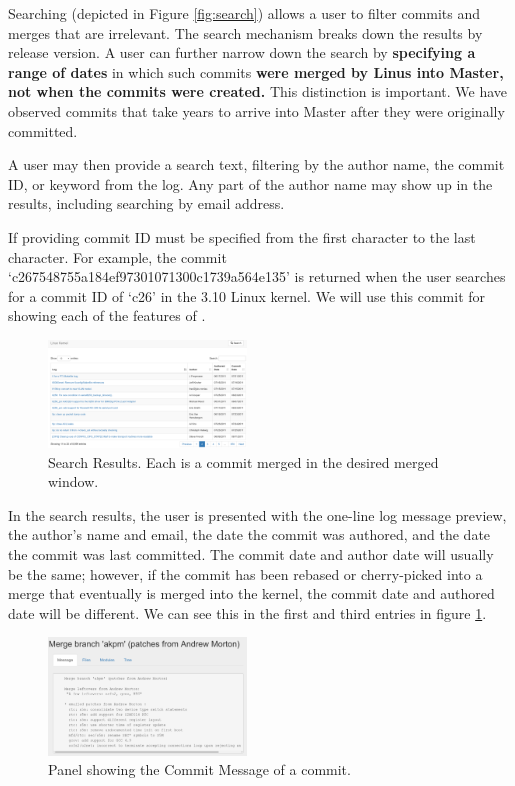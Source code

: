 \documentclass[conference, draftclsnofoot, draft]{IEEEtran}
\begin{document}
Searching (depicted in Figure \ref{fig:search}) allows a user to filter commits and merges that are irrelevant. The search mechanism breaks down the results by
release version.  A user can further narrow down the search by \textbf{specifying a range of dates} in which such commits \textbf{were merged by Linus into
        Master, not
        when the commits were created.} This distinction is important. We have observed commits that take years
to arrive into Master after they were originally committed.

A user may then provide a search text, filtering by the author name,
the commit ID, or keyword from the log. Any part of the author name may show up in
the results, including searching by email address.

If providing commit ID must be specified
from the first character to the last character. For example, the commit
`c267548755a184ef97301071300c1739a564e135' is returned when the user searches for a
commit ID of `c26' in the 3.10 Linux kernel. We will use this commit for showing
each of the features of \tool.

\begin{figure}
        \centering
        \includegraphics[width=0.47\textwidth]{figures/search_results_2.png}
        \caption{Search Results. Each is a commit merged in the desired merged window.}
        \label{fig:results}
\end{figure}

In the search results, the user is presented with the one-line log message preview,
the author's name and email, the date the commit was authored, and the date the
commit was last committed. The commit date and author date will usually be the same;
however, if the commit has been rebased or cherry-picked into a merge that
eventually is merged into the kernel, the commit date and authored date will be
different. We can see this in the first and third entries in figure
\ref{fig:results}.

\begin{figure}
        \centering
        \includegraphics[width=0.47\textwidth]{figures/log_view.png}
        \caption{Panel showing the Commit Message of a commit.}
        \label{fig:message}
\end{figure}
\end{document}
